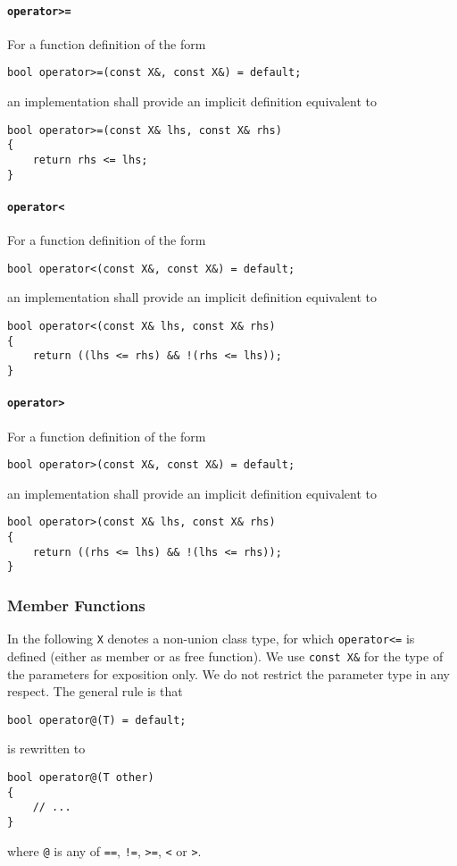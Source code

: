 ﻿\documentclass[a4paper,11pt,twoside,final]{article}
\numberwithin{equation}{subsection}
\begin{document}
\paragraph{\texttt{operator>=}}
For a function definition of the form
\begin{verbatim}
bool operator>=(const X&, const X&) = default;
\end{verbatim}
an implementation shall provide an implicit definition equivalent to
\begin{verbatim}
bool operator>=(const X& lhs, const X& rhs)
{
    return rhs <= lhs;
}
\end{verbatim}

\paragraph{\texttt{operator<}}
For a function definition of the form
\begin{verbatim}
bool operator<(const X&, const X&) = default;
\end{verbatim}
an implementation shall provide an implicit definition equivalent to
\begin{verbatim}
bool operator<(const X& lhs, const X& rhs)
{
    return ((lhs <= rhs) && !(rhs <= lhs));
}
\end{verbatim}

\paragraph{\texttt{operator>}}
For a function definition of the form
\begin{verbatim}
bool operator>(const X&, const X&) = default;
\end{verbatim}
an implementation shall provide an implicit definition equivalent to
\begin{verbatim}
bool operator>(const X& lhs, const X& rhs)
{
    return ((rhs <= lhs) && !(lhs <= rhs));
}
\end{verbatim}

\subsubsection{Member Functions}
In the following \verb|X| denotes a non-union class type, for which \verb|operator<=| is defined (either as member or as free function). We use \verb|const X&| for the type of the parameters for exposition only. We do not restrict the parameter type in any respect. The general rule is that
\begin{verbatim}
bool operator@(T) = default;
\end{verbatim}
is rewritten to
\begin{verbatim}
bool operator@(T other)
{
    // ...
}
\end{verbatim}
where \verb|@| is any of \verb|==|, \verb|!=|, \verb|>=|, \verb|<| or \verb|>|.
\end{document}
